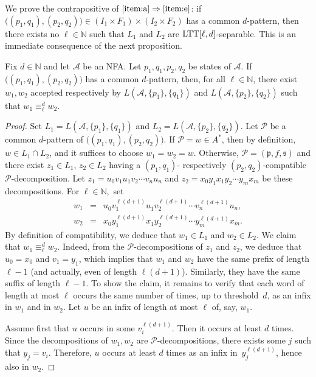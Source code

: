 \documentclass{LMCS}
\newcommand\nat{\ensuremath{\mathbb{N}}\xspace}
\newcommand\As{\ensuremath{\mathcal{A}}\xspace}
\newcommand\Ps{\ensuremath{\mathcal{P}}\xspace}
\newcommand{\ltt}{\textup{LTT}\xspace}
\newcommand\ltteq[2]{\ensuremath{\equiv_{#1}^{#2}}\xspace}
\newcommand\decop[1]{\ensuremath{#1}-decomposition\xspace}
\newcommand\decops[1]{\ensuremath{#1}-decompositions\xspace}
\newcommand\pfsdecomp{\decop{\Ps}}
\newcommand\pfsdecomps{\decops{\Ps}}
\newcommand\frp{\ensuremath{\mathfrak{p}}\xspace}
\newcommand\frs{\ensuremath{\mathfrak{s}}\xspace}
\theoremstyle{plain}
\begin{document}
We prove the contrapositive of $\eqref{item:a} \Rightarrow
\eqref{item:e}$: if $\bigl((p_1,q_1),(p_2,q_2)\bigr)\in(I_1\times F_1) \times(I_2\times F_2)$ has a common $d$-pattern, then
there exists no $\ell \in \nat$ such that $L_1$ and $L_2$ are 
$\ltt[\ell,d]$-separable. This is an immediate consequence of the next
proposition.

\begin{prop} \label{prop:decomptokp} Fix $d \in \nat$ and let
  $\As$ be an NFA. Let $p_1,q_1,p_2,q_2$ be states of $\As$. If $\bigl((p_1,q_1),(p_2,q_2)\bigr)$ has a common
  $d$-pattern, then, for all $\ell \in \nat$, there exist $w_1,w_2$ accepted
  respectively by $L(\As,\{p_1\},\{q_1\})$ and $L(\As,\{p_2\},\{q_2\})$ such that $w_1
  \ltteq{\ell}{d} w_2$.
\end{prop}

\begin{proof}
  Set $L_1=L(\As,\{p_1\},\{q_1\})$ and $L_2=L(\As,\{p_2\},\{q_2\})$.
  Let \Ps be a common $d$-pattern of $\bigl((p_1,q_1),(p_2,q_2)\bigr)$. If $\Ps = w
  \in A^*$, then by definition, $w\in L_1\cap L_2$, and it suffices to choose
  $w_1 = w_2 = w$. Otherwise, $\Ps=(\frp,f,\frs)$ and there exist $z_1\in
  L_1$, $z_2\in L_2$ having a $(p_1,q_1)$- respectively $(p_2,q_2)$-compatible
  \pfsdecomp. Let $z_1=u_0v_1u_1v_2 \cdots v_{n}u_n$ and $z_2=x_0y_1x_1y_2
  \cdots y_{m}x_m$ be these decompositions. For $\ell \in \nat$,~set
  \[
  \begin{array}{lll}
    w_1 & = & u^{}_0v_1^{\ell(d+1)}u^{}_1v_2^{\ell(d+1)} \cdots
    v_{n}^{\ell(d+1)}u^{}_n, \\
    w_2 & = & x^{}_0y_1^{\ell(d+1)}x^{}_1y_2^{\ell(d+1)} \cdots
    y_{m}^{\ell(d+1)}x^{}_m.
  \end{array}
  \]
  By definition of compatibility, we deduce that $w_1\in L_1$ and $w_2\in
  L_2$. We claim that $w_1 \ltteq{\ell}{d} w_2$.  Indeed, from the
  \pfsdecomps of $z_1$ and $z_2$, we deduce that $u_0=x_0$ and
  $v_1=y_1$, which implies that $w_1$ and $w_2$ have the same prefix
  of length $\ell-1$ (and actually, even of length $\ell(d+1)$). Similarly,
  they have the same suffix of length $\ell-1$. To show the claim, it
  remains to verify that each word of length at most $\ell$ occurs the
  same number of times, up to threshold~$d$, as an infix in $w_1$ and
  in $w_2$. Let $u$ be an infix of length at most $\ell$ of, say, $w_1$. 

  Assume first that $u$ occurs in some $v_i^{\ell(d+1)}$. Then it occurs
  at least $d$ times. Since the decompositions of $w_1,w_2$ are
  \pfsdecomps, there exists some $j$ such that $y_j=v_i$. Therefore,
  $u$ occurs at least $d$ times as an infix in~$y_j^{\ell(d+1)}$, hence
  also in $w_2$.


\end{proof}
\end{document}
